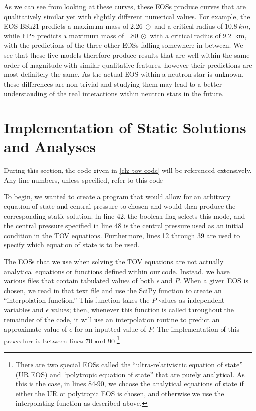 As we can see from looking at these curves, these EOSs produce curves that are qualitatively similar yet with slightly different numerical values. For example, the EOS BSk21 predicts a maximum mass of $\SI{2.26}{\odot}$ and a critical radius of $\SI{10.8}{km}$, while FPS predicts a maximum mass of $\SI{1.80}{\odot}$ with a critical radius of \SI{9.2}{km}, with the predictions of the three other EOSs falling somewhere in between. We see that these five models therefore produce results that are well within the same order of magnitude with similar qualitative features, however their predictions are most definitely the same. As the actual EOS within a neutron star is unknown, these differences are non-trivial and studying them may lead to a better understanding of the real interactions within neutron stars in the future.

\section{Implementation of Static Solutions and Analyses}

During this section, the code given in \autoref{ch: tov code} will be referenced extensively. Any line numbers, unless specified, refer to this code

To begin, we wanted to create a program that would allow for an arbitrary equation of state and central pressure to chosen and would then produce the corresponding static solution. In line 42, the boolean flag  selects this mode, and the central pressure specified in line 48 is the central pressure used as an initial condition in the TOV equations. Furthermore, lines 12 through 39 are used to specify which equation of state is to be used.

The EOSs that we use when solving the TOV equations are not actually analytical equations or functions defined within our code. Instead, we have various  files that contain tabulated values of both $\epsilon$ and $P$. When a given EOS is chosen, we read in that text file and use the SciPy function  to create an ``interpolation function.'' This function takes the $P$ values as independent variables and $\epsilon$ values; then, whenever this function is called throughout the remainder of the code, it will use an interpolation routine to predict an approximate value of $\epsilon$ for an inputted value of $P$. The implementation of this procedure is between lines 70 and 90.\footnote{There are two special EOSs called the ``ultra-relativisitic equation of state'' (UR EOS) and ``polytropic equation of state'' that are purely analytical. As this is the case, in lines 84-90, we choose the analytical equations of state if either the UR or polytropic EOS is chosen, and otherwise we use the interpolating function as described above.}

